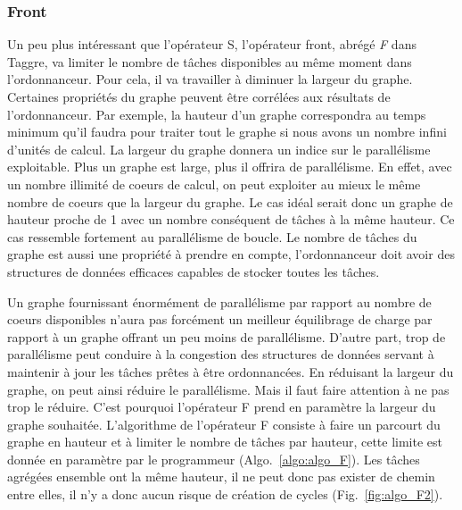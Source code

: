 \subsubsection{Front}
Un peu plus intéressant que l'opérateur S, l'opérateur front, abrégé {\em F} dans Taggre, va limiter le nombre de tâches disponibles au même moment dans l'ordonnanceur.
%
Pour cela, il va travailler à diminuer la largeur du graphe.
%
Certaines propriétés du graphe peuvent être corrélées aux résultats de l'ordonnanceur.
%
Par exemple, la hauteur d'un graphe correspondra au temps minimum qu'il faudra pour traiter tout le graphe si nous avons un nombre infini d'unités de calcul.
%
La largeur du graphe donnera un indice sur le parallélisme exploitable.
%
Plus un graphe est large, plus il offrira de parallélisme.
%
En effet, avec un nombre illimité de coeurs de calcul, on peut exploiter au mieux le même nombre de coeurs que la largeur du graphe.
%
Le cas idéal serait donc un graphe de hauteur proche de 1 avec un nombre conséquent de tâches à la même hauteur.
%
Ce cas ressemble fortement au parallélisme de boucle.
%
Le nombre de tâches du graphe est aussi une propriété à prendre en compte, l'ordonnanceur doit avoir des structures de données efficaces capables de stocker toutes les tâches.

Un graphe fournissant énormément de parallélisme par rapport au nombre de coeurs disponibles n'aura pas forcément un meilleur équilibrage de charge par rapport à un graphe offrant un peu moins de parallélisme.
%
D'autre part, trop de parallélisme peut conduire à la congestion des structures de données servant à maintenir à jour les tâches prêtes à être ordonnancées.
%
En réduisant la largeur du graphe, on peut ainsi réduire le parallélisme.
%
Mais il faut faire attention à ne pas trop le réduire.
%
C'est pourquoi l'opérateur F prend en paramètre la largeur du graphe souhaitée.
%
L'algorithme de l'opérateur F consiste à faire un parcourt du graphe en hauteur et à limiter le nombre de tâches par hauteur, cette limite est donnée en paramètre par le programmeur (Algo.~\ref{algo:algo_F}).
%
Les tâches agrégées ensemble ont la même hauteur, il ne peut donc pas exister de chemin entre elles, il n'y a donc aucun risque de création de cycles (Fig.~\ref{fig:algo_F2}).

